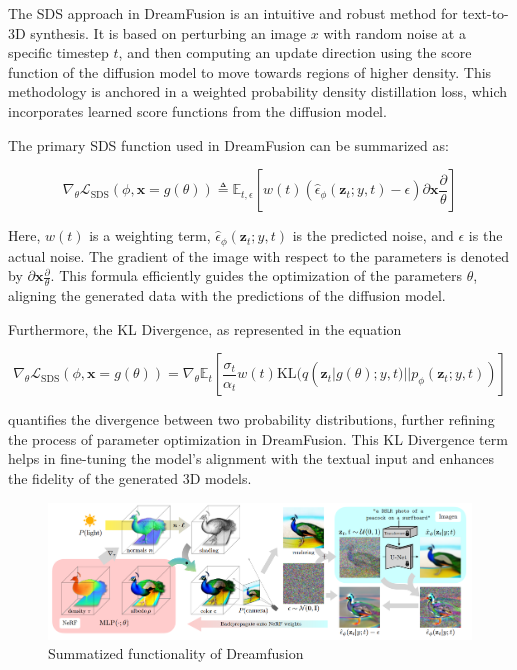 The SDS approach in DreamFusion is an intuitive and robust method for text-to-3D synthesis. It is based on perturbing an image \( x \) with random noise at a specific timestep \( t \), and then computing an update direction using the score function of the diffusion model to move towards regions of higher density. This methodology is anchored in a weighted probability density distillation loss, which incorporates learned score functions from the diffusion model.

The primary SDS function used in DreamFusion can be summarized as:

\[
\nabla_{\theta}\mathcal{L}_{\text{SDS}}(\phi,\mathbf{x}=g(\theta))\triangleq\mathbb{E}_{t,\epsilon}\left[w(t)\left(\hat{\epsilon}_{\phi}({\mathbf{z}}_{t};y,t)-\epsilon\right){\partial\mathbf{x}\frac\partial\theta}\right]
\]

Here, \( w(t) \) is a weighting term, \( \hat{\epsilon}_{\phi}({\mathbf{z}}_{t};y,t) \) is the predicted noise, and \( \epsilon \) is the actual noise. The gradient of the image with respect to the parameters is denoted by \( {\partial\mathbf{x}\frac\partial\theta} \). This formula efficiently guides the optimization of the parameters \( \theta \), aligning the generated data with the predictions of the diffusion model.

Furthermore, the KL Divergence, as represented in the equation 

\[
\nabla_{\theta}\mathcal{L}_{\text{SDS}}(\phi, \mathbf{x} = g(\theta)) = \nabla_{\theta}\mathbb{E}_t \left[ \frac{\sigma_t}{\alpha_t} w(t) \text{KL}(q(\mathbf{z}_t | g(\theta); y, t) || p_{\phi}(\mathbf{z}_t; y, t)) \right]
\]

quantifies the divergence between two probability distributions, further refining the process of parameter optimization in DreamFusion. This KL Divergence term helps in fine-tuning the model's alignment with the textual input and enhances the fidelity of the generated 3D models.

\begin{figure}[ht]
  \centering
    \includegraphics[width=1\columnwidth]{figures/Dreamfusion.png}
    \caption{Summatized functionality of Dreamfusion}\label{fig:figureDreamfusion}
  \end{figure}


